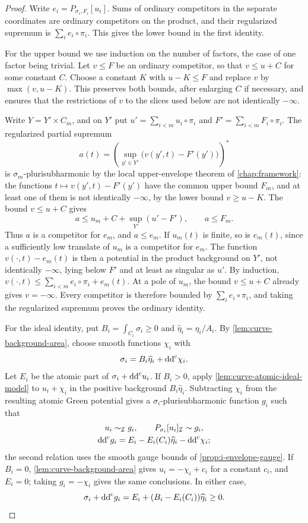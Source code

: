 \begin{proof}
Write $e_i=P_{\sigma_i,F_i}[u_i]$. Sums of ordinary competitors in the separate coordinates are ordinary competitors on the product, and their regularized supremum is $\sum_i e_i\circ\pi_i$. This gives the lower bound in the first identity.

For the upper bound we use induction on the number of factors, the case of one factor being trivial. Let $v\leq F$ be an ordinary competitor, so that $v\leq u+C$ for some constant $C$. Choose a constant $K$ with $u-K\leq F$ and replace $v$ by $\max(v,u-K)$. This preserves both bounds, after enlarging $C$ if necessary, and ensures that the restrictions of $v$ to the slices used below are not identically $-\infty$.

Write $Y=Y'\times C_m$, and on $Y'$ put $u'=\sum_{i<m}u_i\circ\pi_i$ and $F'=\sum_{i<m}F_i\circ\pi_i$. The regularized partial supremum
\[
 a(t)=\left(\sup_{y'\in Y'}\bigl(v(y',t)-F'(y')\bigr)\right)^*
\]
is $\sigma_m$-plurisubharmonic by the local upper-envelope theorem of \cref{chap:framework}: the functions $t\mapsto v(y',t)-F'(y')$ have the common upper bound $F_m$, and at least one of them is not identically $-\infty$, by the lower bound $v\geq u-K$. The bound $v\leq u+C$ gives
\[
 a\leq u_m+C+\sup_{Y'}(u'-F'),\qquad a\leq F_m.
\]
Thus $a$ is a competitor for $e_m$, and $a\leq e_m$. If $u_m(t)$ is finite, so is $e_m(t)$, since a sufficiently low translate of $u_m$ is a competitor for $e_m$. The function $v(\cdot,t)-e_m(t)$ is then a potential in the product background on $Y'$, not identically $-\infty$, lying below $F'$ and at least as singular as $u'$. By induction, $v(\cdot,t)\leq\sum_{i<m}e_i\circ\pi_i+e_m(t)$. At a pole of $u_m$, the bound $v\leq u+C$ already gives $v=-\infty$. Every competitor is therefore bounded by $\sum_i e_i\circ\pi_i$, and taking the regularized supremum proves the ordinary identity.

For the ideal identity, put $B_i=\int_{C_i}\sigma_i\geq0$ and $\widehat\eta_i=\eta_i/A_i$. By \cref{lem:curve-background-area}, choose smooth functions $\chi_i$ with
\[
 \sigma_i=B_i\widehat\eta_i+\mathrm{dd}^{\mathrm{c}}\chi_i.
\]
Let $E_i$ be the atomic part of $\sigma_i+\mathrm{dd}^{\mathrm{c}} u_i$. If $B_i>0$, apply \cref{lem:curve-atomic-ideal-model} to $u_i+\chi_i$ in the positive background $B_i\widehat\eta_i$. Subtracting $\chi_i$ from the resulting atomic Green potential gives a $\sigma_i$-plurisubharmonic function $g_i$ such that
\[
 \begin{gathered}
 u_i\sim_{\mathcal I}g_i,\qquad
 P_{\sigma_i}[u_i]_{\mathcal I}\sim g_i,\\
 \mathrm{dd}^{\mathrm{c}} g_i=E_i-E_i(C_i)\widehat\eta_i-\mathrm{dd}^{\mathrm{c}}\chi_i;
 \end{gathered}
\]
the second relation uses the smooth gauge bounds of \cref{prop:i-envelope-gauge}. If $B_i=0$, \cref{lem:curve-background-area} gives $u_i=-\chi_i+c_i$ for a constant $c_i$, and $E_i=0$; taking $g_i=-\chi_i$ gives the same conclusions. In either case,
\[
 \sigma_i+\mathrm{dd}^{\mathrm{c}} g_i
       =E_i+(B_i-E_i(C_i))\widehat\eta_i\geq0.
\]


\end{proof}

